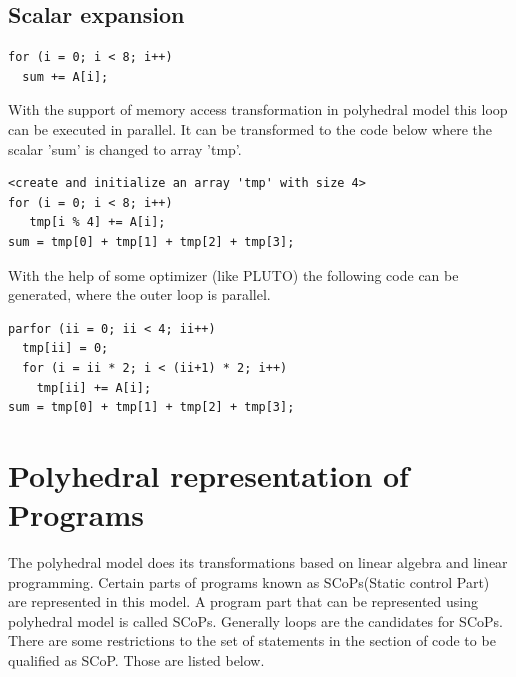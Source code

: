 \subsection{Scalar expansion}
{\footnotesize
\begin{lstlisting}
for (i = 0; i < 8; i++)
  sum += A[i];
\end{lstlisting}
}
With the support of memory access transformation in polyhedral model this loop
can be executed in parallel. It can be transformed to the code below where the scalar 'sum'
is changed to array 'tmp'.  
{\footnotesize
\begin{lstlisting}
<create and initialize an array 'tmp' with size 4>
for (i = 0; i < 8; i++)
   tmp[i % 4] += A[i];
sum = tmp[0] + tmp[1] + tmp[2] + tmp[3];
\end{lstlisting}
}
With the help of some optimizer (like PLUTO\cite{pluto}) the following code
can be generated, where the outer loop is parallel.
{\footnotesize
\begin{lstlisting}
parfor (ii = 0; ii < 4; ii++)
  tmp[ii] = 0;
  for (i = ii * 2; i < (ii+1) * 2; i++)
    tmp[ii] += A[i];
sum = tmp[0] + tmp[1] + tmp[2] + tmp[3];
\end{lstlisting}
}

\section{Polyhedral representation of Programs}

The polyhedral model does its transformations based on linear algebra and linear programming.
Certain parts of programs known as SCoPs(Static control Part) are represented in this model.
A program part that can be represented using polyhedral model is called SCoPs. Generally
loops are the candidates for SCoPs. There are some restrictions to the set of statements 
in the section of code to be qualified as SCoP. Those are listed below.

